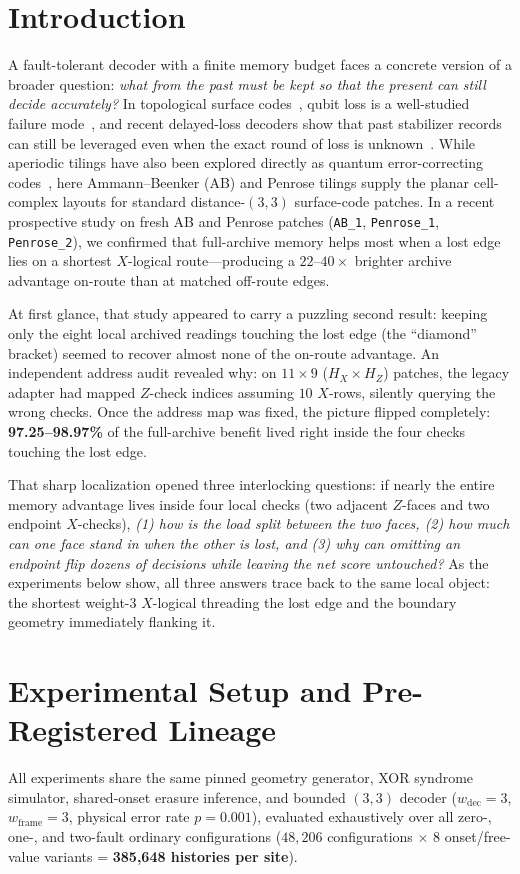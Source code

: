 \documentclass[11pt,a4paper]{article}
\begin{document}
\section{Introduction}
A fault-tolerant decoder with a finite memory budget faces a concrete version of a broader question: \emph{what from the past must be kept so that the present can still decide accurately?} In topological surface codes~\cite{Dennis2002}, qubit loss is a well-studied failure mode~\cite{Stace2009}, and recent delayed-loss decoders show that past stabilizer records can still be leveraged even when the exact round of loss is unknown~\cite{Baranes2026}. While aperiodic tilings have also been explored directly as quantum error-correcting codes~\cite{LiBoyle2023}, here Ammann--Beenker (AB) and Penrose tilings supply the planar cell-complex layouts for standard distance-$(3,3)$ surface-code patches. In a recent prospective study on fresh AB and Penrose patches (\texttt{AB\_1}, \texttt{Penrose\_1}, \texttt{Penrose\_2}), we confirmed that full-archive memory helps most when a lost edge lies on a shortest $X$-logical route---producing a $22$--$40\times$ brighter archive advantage on-route than at matched off-route edges.

At first glance, that study appeared to carry a puzzling second result: keeping only the eight local archived readings touching the lost edge (the ``diamond'' bracket) seemed to recover almost none of the on-route advantage. An independent address audit revealed why: on $11\times 9$ ($H_X \times H_Z$) patches, the legacy adapter had mapped $Z$-check indices assuming $10$ $X$-rows, silently querying the wrong checks. Once the address map was fixed, the picture flipped completely: \textbf{97.25--98.97\%} of the full-archive benefit lived right inside the four checks touching the lost edge.

That sharp localization opened three interlocking questions: if nearly the entire memory advantage lives inside four local checks (two adjacent $Z$-faces and two endpoint $X$-checks), \emph{(1) how is the load split between the two faces, (2) how much can one face stand in when the other is lost, and (3) why can omitting an endpoint flip dozens of decisions while leaving the net score untouched?} As the experiments below show, all three answers trace back to the same local object: the shortest weight-3 $X$-logical threading the lost edge and the boundary geometry immediately flanking it.

\section{Experimental Setup and Pre-Registered Lineage}
All experiments share the same pinned geometry generator, XOR syndrome simulator, shared-onset erasure inference, and bounded $(3,3)$ decoder ($w_{\mathrm{dec}} = 3$, $w_{\mathrm{frame}} = 3$, physical error rate $p = 0.001$), evaluated exhaustively over all zero-, one-, and two-fault ordinary configurations ($48{,}206$ configurations $\times$ $8$ onset/free-value variants = \textbf{385,648 histories per site}).
\end{document}
